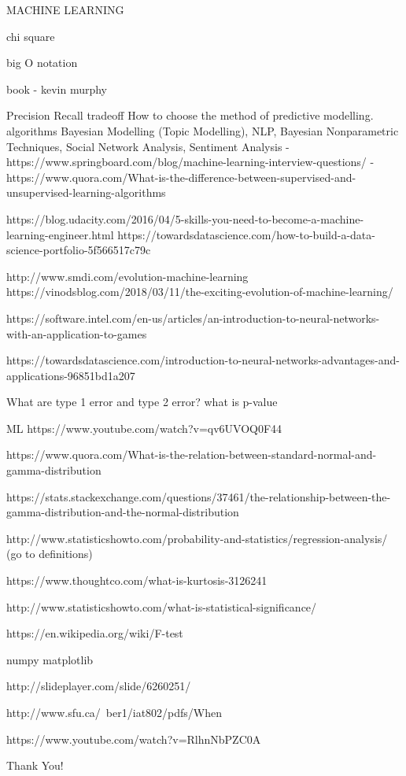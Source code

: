 \documentclass{beamer}
\begin{document}
\begin{frame}
	MACHINE LEARNING
	
	chi square
	
	big O notation
	
	
	book - kevin murphy
	
	Precision Recall tradeoff
	How to choose the method of predictive modelling.
	algorithms
	Bayesian Modelling (Topic Modelling), NLP, Bayesian Nonparametric Techniques, Social Network Analysis, Sentiment Analysis
	- https://www.springboard.com/blog/machine-learning-interview-questions/
	- https://www.quora.com/What-is-the-difference-between-supervised-and-unsupervised-learning-algorithms
	
	https://blog.udacity.com/2016/04/5-skills-you-need-to-become-a-machine-learning-engineer.html
	https://towardsdatascience.com/how-to-build-a-data-science-portfolio-5f566517c79c
	
	http://www.smdi.com/evolution-machine-learning
	https://vinodsblog.com/2018/03/11/the-exciting-evolution-of-machine-learning/
	
	
	https://software.intel.com/en-us/articles/an-introduction-to-neural-networks-with-an-application-to-games
	
	https://towardsdatascience.com/introduction-to-neural-networks-advantages-and-applications-96851bd1a207
	
	What are type 1 error and type 2 error? what is p-value 
	
	ML
	https://www.youtube.com/watch?v=qv6UVOQ0F44
	
	https://www.quora.com/What-is-the-relation-between-standard-normal-and-gamma-distribution
	
	
	https://stats.stackexchange.com/questions/37461/the-relationship-between-the-gamma-distribution-and-the-normal-distribution
	
	http://www.statisticshowto.com/probability-and-statistics/regression-analysis/
	(go to definitions)
	
	https://www.thoughtco.com/what-is-kurtosis-3126241
	
	http://www.statisticshowto.com/what-is-statistical-significance/
	
	https://en.wikipedia.org/wiki/F-test
	
	numpy matplotlib
	
	http://slideplayer.com/slide/6260251/
	
	http://www.sfu.ca/~ber1/iat802/pdfs/When%
	
	https://www.youtube.com/watch?v=RlhnNbPZC0A
\end{frame}



\begin{frame}

\end{frame}

\begin{frame}
	Thank You!
\end{frame}
\end{document}
